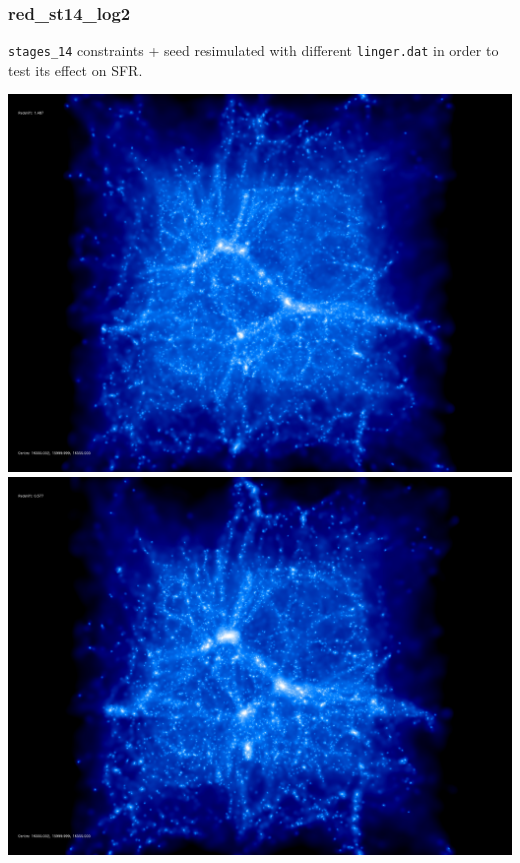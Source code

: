 % 
%
%
%
%
%
%
%

\newpage

\subsubsection{red\_st14\_log2}
\texttt{stages\_14} constraints + seed resimulated with different \texttt{linger.dat} in order
to test its effect on SFR. 

\includegraphics[scale=0.1]{r256/h70/red_st14_log2/50.jpg} 
\includegraphics[scale=0.1]{r256/h70/red_st14_log2/100.jpg} \\ 
